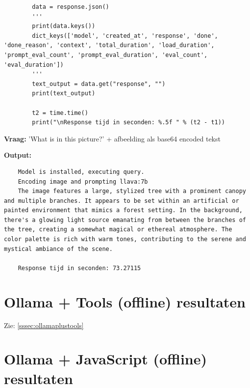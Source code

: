\begin{listing}
\begin{verbatim}
        data = response.json()
        '''
        print(data.keys())
        dict_keys(['model', 'created_at', 'response', 'done', 'done_reason', 'context', 'total_duration', 'load_duration', 'prompt_eval_count', 'prompt_eval_duration', 'eval_count', 'eval_duration'])
        '''
        text_output = data.get("response", "")
        print(text_output)
        
        t2 = time.time()
        print("\nResponse tijd in seconden: %.5f " % (t2 - t1))
    \end{verbatim}
    \caption[Ollama API Img Code]{Code om te communiceren met \textit{llava:7b}.}
    \label{lst:ollama-localhost-api-img-test}
\end{listing}

\textbf{Vraag:} 'What is in this picture?' + afbeelding als base64 encoded tekst

\textbf{Output:}

\begin{verbatim}
    Model is installed, executing query.
    Encoding image and prompting llava:7b
    The image features a large, stylized tree with a prominent canopy and multiple branches. It appears to be set within an artificial or painted environment that mimics a forest setting. In the background, there's a glowing light source emanating from between the branches of the tree, creating a somewhat magical or ethereal atmosphere. The color palette is rich with warm tones, contributing to the serene and mystical ambiance of the scene.
    
    Response tijd in seconden: 73.27115
\end{verbatim}

\section{Ollama + Tools (offline) resultaten}
\label{sec:ollamaplustoolsofflineresultaten}

Zie: \ref{sssec:ollamaplustools}

\section{Ollama + JavaScript (offline) resultaten}
\label{sec:ollamaplusjavascriptofflineresultaten}

